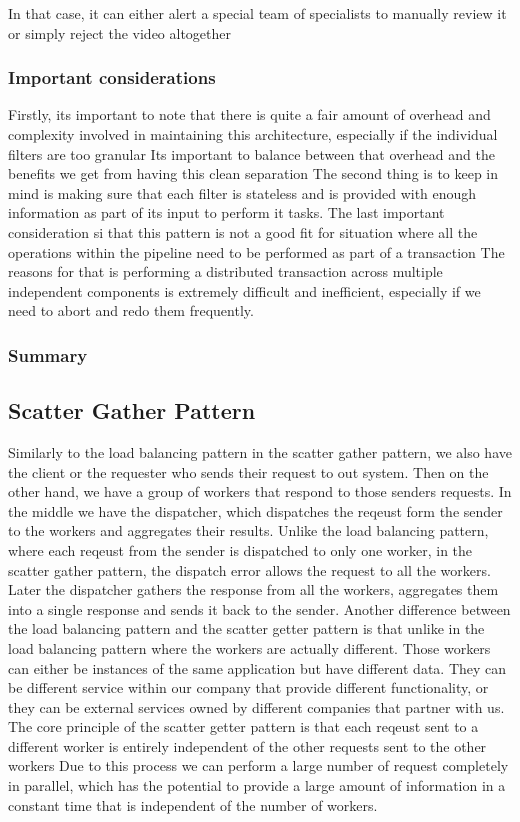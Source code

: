 In that case, it can either alert a special team of specialists to manually review it or simply reject the video altogether

\subsubsection{Important considerations}
Firstly, its important to note that there is quite a fair amount of overhead and complexity involved in maintaining this architecture, especially if the individual filters are too granular
Its important to balance between that overhead and the benefits we get from having this clean separation
The second thing is to keep in mind is making sure that each filter is stateless and is provided with enough information as part of its input to perform it tasks.
The last important consideration si that this pattern is not a good fit for situation where all the operations within the pipeline need to be performed as part of a transaction
The reasons for that is performing a distributed transaction across multiple independent components is extremely difficult and inefficient, especially if we need to abort and redo them frequently.

\subsubsection{Summary}

\subsection{Scatter Gather Pattern}

Similarly to the load balancing pattern in the scatter gather pattern, we also have the client or the requester who sends their request to out system.
Then on the other hand, we have a group of workers that respond to those senders requests.
In the middle we have the dispatcher, which dispatches the reqeust form the sender to the workers and aggregates their results.
Unlike the load balancing pattern, where each reqeust from the sender is dispatched to only one worker, in the scatter gather pattern, the dispatch error allows the request to all the workers.
Later the dispatcher gathers the response from all the workers, aggregates them into a single response and sends it back to the sender.
Another difference between the load balancing pattern and the scatter getter pattern is that unlike in the load balancing pattern where the workers are actually different.
Those workers can either be instances of the same application but have different data.
They can be different service within our company that provide different functionality, or they can be external services owned by different companies that partner with us.
The core principle of the scatter getter pattern is that each reqeust sent to a different worker is entirely independent of the other requests sent to the other workers
Due to this process we can perform a large number of request completely in parallel, which has the potential to provide a large amount of information in a constant time that is independent of the number of workers.

